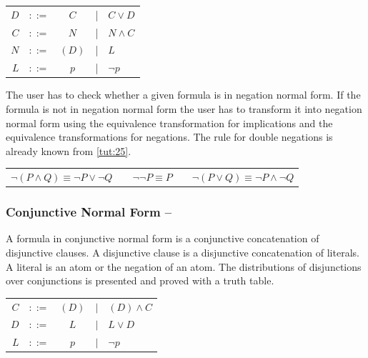 \begin{center}
\begin{tabular}{rcccl}
$D$		&$::=$ & $C$ 		&|& 	$C \vee D$\\
$C$		&$::=$ & $N$ 		&|& 	$N \wedge C$ \\
$N$		&$::=$ & $(D)$ 	&|& 	$L$\\
$L$		&$::=$ & $p $ 		&|& 	$\neg p$
\end{tabular}
\end{center}

The user has to check whether a given formula is in negation normal form.
If the formula is not in negation normal form
the user has to transform it into negation normal form
using the equivalence transformation for implications and the equivalence transformations for negations.
The rule for double negations is already known from \vref{tut:25}.

\begin{center}
\begin{tabular}{cp{5mm}cp{5mm}c}
$\neg (P \wedge Q) \equiv \neg P \vee \neg Q$& &
$\neg \neg P \equiv P$ & &
$\neg (P \vee Q)  \equiv \neg P \wedge \neg Q$
\end{tabular}
\end{center}

\subsubsection{Conjunctive Normal Form – }
\label{tut:43}
A formula in conjunctive normal form is a conjunctive concatenation of disjunctive clauses.
A disjunctive clause is a disjunctive concatenation of literals. 
A literal is an atom or the negation of an atom. 
The distributions of disjunctions over conjunctions is presented
and proved with a truth table.

\begin{center}
\begin{tabular}{rcccl}
$C$	&$::=$ & $(D)$ 	&$|$ & $(D) \wedge C$\\
$D$	&$::=$ & $L$ 	&$|$ & $L \vee D$\\
$L$	&$::=$ & $p$ 	&$|$ & $\neg p$ 
\end{tabular}
\end{center}

